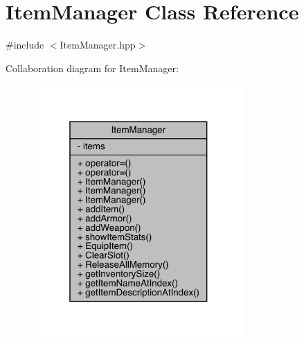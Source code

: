 \hypertarget{class_item_manager}{}\section{Item\+Manager Class Reference}
\label{class_item_manager}


{\ttfamily \#include $<$Item\+Manager.\+hpp$>$}



Collaboration diagram for Item\+Manager\+:
\nopagebreak
\begin{figure}[H]
\begin{center}
\leavevmode
\includegraphics[width=229pt]{d2/d0e/class_item_manager__coll__graph}
\end{center}
\end{figure}
